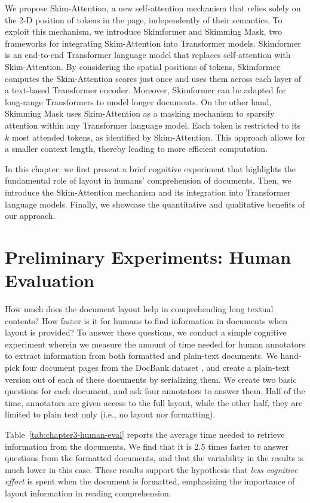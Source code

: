 We propose Skim-Attention, a new self-attention mechanism that relies solely on the 2-D position of tokens in the page, independently of their semantics. To exploit this mechanism, we introduce Skimformer and Skimming Mask, two frameworks for integrating Skim-Attention into Transformer models. Skimformer is an end-to-end Transformer language model that replaces self-attention with Skim-Attention. By considering the spatial positions of tokens, Skimformer computes the Skim-Attention scores just once and uses them across each layer of a text-based Transformer encoder. Moreover, Skimformer can be adapted for long-range Transformers to model longer documents. On the other hand, Skimming Mask uses Skim-Attention as a masking mechanism to sparsify attention within any Transformer language model. Each token is restricted to its $k$ most attended tokens, as identified by Skim-Attention. This approach allows for a smaller context length, thereby leading to more efficient computation.

In this chapter, we first present a brief cognitive experiment that highlights the fundamental role of layout in humans' comprehension of documents. Then, we introduce the Skim-Attention mechanism and its integration into Transformer language models. Finally, we showcase the quantitative and qualitative benefits of our approach.


\section{Preliminary Experiments: Human Evaluation}
\label{section:chapter3-human-evaluation}

How much does the document layout help in comprehending long textual contents? How faster is it for humans to find information in documents when layout is provided? To answer these questions, we conduct a simple cognitive experiment wherein we measure the amount of time needed for human annotators to extract information from both formatted and plain-text documents. We hand-pick four document pages from the DocBank dataset \citep{li2020docbank}, and create a plain-text version out of each of these documents by serializing them. We create two basic questions for each document, and ask four annotators to answer them. Half of the time, annotators are given access to the full layout, while the other half, they are limited to plain text only (i.e., no layout nor formatting).


Table~\ref{tab:chapter3-human-eval} reports the average time needed to retrieve information from the documents. We find that it is 2.5 times faster to answer questions from the formatted documents, and that the variability in the results is much lower in this case. These results support the hypothesis that \emph{less cognitive effort} is spent when the document is formatted, emphasizing the importance of layout information in reading comprehension.

